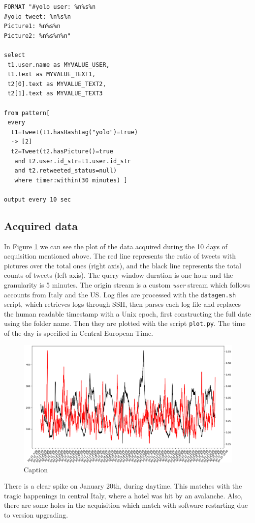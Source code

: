 \documentclass[a4paper]{article}
\begin{document}
\begin{lstlisting}
FORMAT "#yolo user: %n%s%n
#yolo tweet: %n%s%n
Picture1: %n%s%n
Picture2: %n%s%n%n"

select 
 t1.user.name as MYVALUE_USER, 
 t1.text as MYVALUE_TEXT1, 
 t2[0].text as MYVALUE_TEXT2, 
 t2[1].text as MYVALUE_TEXT3

from pattern[
 every
  t1=Tweet(t1.hasHashtag("yolo")=true)
  -> [2] 
  t2=Tweet(t2.hasPicture()=true 
   and t2.user.id_str=t1.user.id_str 
   and t2.retweeted_status=null) 
   where timer:within(30 minutes) ]
      
output every 10 sec
\end{lstlisting}
\subsection{Acquired data}
In Figure \ref{fig:plot} we can see the plot of the data acquired during the 10 days of acquisition mentioned above. The red line represents the ratio of tweets with pictures over the total ones (right axis), and the black line represents the total counts of tweets (left axis). The query window duration is one hour and the granularity is 5 minutes. The origin stream is a custom \textit{user} stream which follows accounts from Italy and the US. Log files are processed with the \lstinline$datagen.sh$ script, which retrieves logs through SSH, then parses each log file and replaces the human readable timestamp with a Unix epoch, first constructing the full date using the folder name. Then they are plotted with the script \lstinline$plot.py$. The time of the day is specified in Central European Time.\par
\begin{figure}[h]
  \centerline{\includegraphics[width=1.5\textwidth]{figure.png}}
  \caption{Caption}
  \label{fig:plot}
\end{figure}
There is a clear spike on January 20th, during daytime. This matches with the tragic happenings in central Italy, where a hotel was hit by an avalanche. Also, there are some holes in the acquisition which match with software restarting due to version upgrading.
\end{document}
